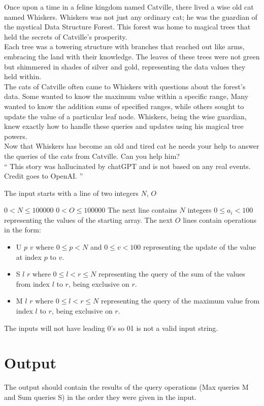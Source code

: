 

\noindent Once upon a time in a feline kingdom named Catville, there lived a wise old cat named Whiskers. Whiskers was not just any ordinary cat; he was the guardian of the mystical Data Structure Forest. This forest was home to magical trees that held the secrets of Catville's prosperity.
\\

\noindent Each tree was a towering structure with branches that reached out like arms, embracing the land with their knowledge. The leaves of these trees were not green but shimmered in shades of silver and gold, representing the data values they held within.
\\

\noindent The cats of Catville often came to Whiskers with questions about the forest's data. Some wanted to know the maximum value within a specific range, Many wanted to know the addition sums of specified ranges, while others sought to update the value of a particular leaf node. Whiskers, being the wise guardian, knew exactly how to handle these queries and updates using his magical tree powers.
\\

\noindent Now that Whiskers has become an old and tired cat he needs your help to answer the queries of the cats from Catville. Can you help him?
\\

\noindent `` This story was hallucinated by chatGPT and is not based on any real events. Credit goes to OpenAI. '' 

{\setlength{\parindent}{0cm}
}
\begin{Input}
The input starts with a line of two integers $N$, $O$
\newline
{\setlength{\parindent}{0cm}
$0 < N \leq 100 000$
\newline
$0 < O \leq 100 000$ 
\newline
The next line contains $N$ integers $0 \leq a_i < 100$ representing the values of the starting array.  
\newline
The next $O$ lines contain operations in the form:
\begin{itemize}
    \item U $p$ $v$ where $0 \leq p < N$ and $0 \leq v < 100$ representing the update of the value at index $p$ to $v$.
    \item S $l$ $r$ where $0 \leq l < r \leq N$ representing the query of the sum of the values from index $l$ to $r$, being exclusive on $r$.
    \item M $l$ $r$ where $0 \leq l < r \leq N$ representing the query of the maximum value from index $l$ to $r$, being exclusive on $r$.
\end{itemize}
}
{\setlength{\parindent}{0cm}
The inputs will not have leading 0's so 01 is not a valid input string.
}
\end{Input}

\section*{Output}
The output should contain the results of the query operations (Max queries M and Sum queries S) in the order they were given in the input. 
{\setlength{\parindent}{0cm}
}
